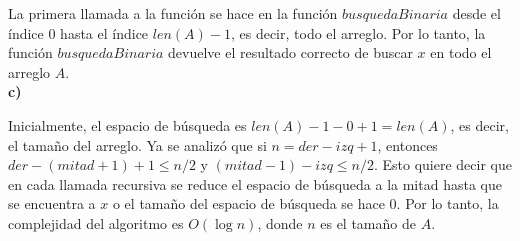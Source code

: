 \documentclass{article}
\begin{document}
La primera llamada a la función se hace en la función $busquedaBinaria$ desde el índice 0 hasta el índice $len(A)-1$, es decir, todo el arreglo. Por lo tanto, la función $busquedaBinaria$ devuelve el resultado correcto de buscar $x$ en todo el arreglo $A$.\\

\textbf{c)}

Inicialmente, el espacio de búsqueda es $len(A)-1-0+1 = len(A)$, es decir, el tamaño del arreglo. Ya se analizó que si $n = der-izq+1$, entonces $der-(mitad+1)+1 \leq n/2$ y $(mitad-1)-izq \leq n/2$. Esto quiere decir que en cada llamada recursiva se reduce el espacio de búsqueda a la mitad hasta que se encuentra a $x$ o el tamaño del espacio de búsqueda se hace 0. Por lo tanto, la complejidad del algoritmo es $O(\log n)$, donde $n$ es el tamaño de $A$.
\end{document}
